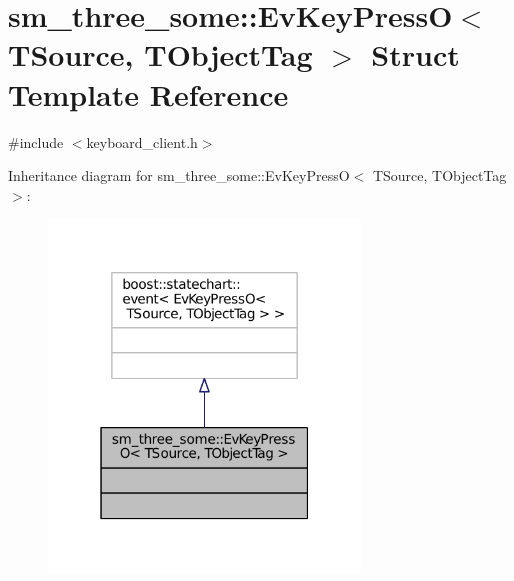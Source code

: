 \hypertarget{structsm__three__some_1_1EvKeyPressO}{}\section{sm\+\_\+three\+\_\+some\+:\+:Ev\+Key\+PressO$<$ T\+Source, T\+Object\+Tag $>$ Struct Template Reference}
\label{structsm__three__some_1_1EvKeyPressO}


{\ttfamily \#include $<$keyboard\+\_\+client.\+h$>$}



Inheritance diagram for sm\+\_\+three\+\_\+some\+:\+:Ev\+Key\+PressO$<$ T\+Source, T\+Object\+Tag $>$\+:
\nopagebreak
\begin{figure}[H]
\begin{center}
\leavevmode
\includegraphics[width=235pt]{structsm__three__some_1_1EvKeyPressO__inherit__graph}
\end{center}
\end{figure}


